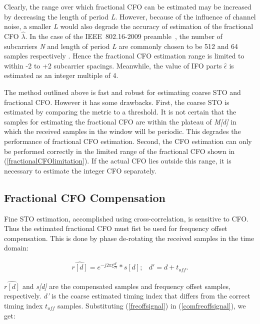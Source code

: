 Clearly, the range over which fractional CFO can be estimated may be increased by decreasing the length of period \emph{L}. 
However, because of the influence of channel noise, a smaller \emph{L} would also degrade the accuracy of estimation of the fractional CFO $\hat{\lambda}$.
In the case of the IEEE~802.16-2009 preamble~\cite{IEEE80216}, the number of subcarriers \emph{N} and length of period \emph{L} are commonly chosen to be 512 and 64 samples respectively \cite{Kim2008}. 
Hence the fractional CFO estimation range is limited to within -2 to +2 subcarrier spacings. Meanwhile, the value of IFO parts $\hat{\epsilon}$ is estimated as an integer multiple of 4.

The method outlined above is fast and robust for estimating coarse STO and fractional CFO. 
However it has some drawbacks. 					
First, the coarse STO is estimated by comparing the metric to a threshold. 
It is not certain that the samples for estimating the fractional CFO are within the plateau of \emph{M[d]} in which the received samples in the window will be periodic.
This degrades the performance of fractional CFO estimation.
Second, the CFO estimation can only be performed correctly in the limited range of the fractional CFO shown in (\ref{fractionalCFOlimitation}). 
If the actual CFO lies outside this range, it is necessary to estimate the integer CFO separately.

\subsection{Fractional CFO Compensation}

Fine STO estimation, accomplished using cross-correlation, is sensitive to CFO. 
Thus the estimated fractional CFO must fist be used for frequency offset compensation.
This is done by phase de-rotating the received samples in the time domain:

\begin{eqnarray}
\label{comfreoffsignal}
\widehat{r[d]} =  e^{-j2\pi\xi \frac{d'}{N}}*s[d];  & d' = d + \mathit{t_{off}}.
\end{eqnarray}

$\widehat{r[d]}$ and \emph{s[d]} are the compensated samples and frequency offset samples, respectively. \emph{d'} is the coarse estimated timing index that differs from the correct timing index $\mathit{t_{off}}$ samples.
Substituting (\ref{freoffsignal}) in (\ref{comfreoffsignal}), we get:

